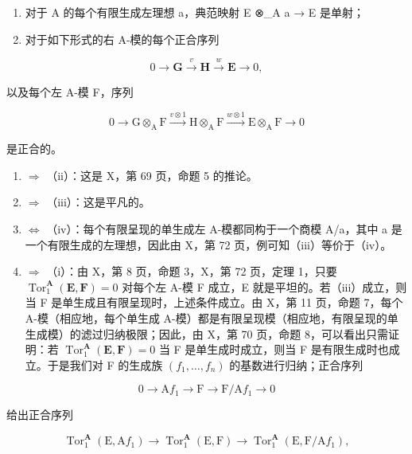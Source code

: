 \begin{enumerate}
\def\labelenumi{(\roman{enumi})}
\setcounter{enumi}{3}
\item
  对于 A 的每个有限生成左理想 a，典范映射 E ⊗\_A a → E 是单射；
\item
  对于如下形式的右 A-模的每个正合序列
\end{enumerate}

\[
0 \rightarrow \mathbf {G} \xrightarrow {v} \mathbf {H} \xrightarrow {w} \mathbf {E} \rightarrow 0,
\]

以及每个左 A-模 F，序列

\[
0 \longrightarrow \mathrm{G} \otimes_ {\mathrm{A}} \mathrm{F} \xrightarrow {v \otimes 1} \mathrm{H} \otimes_ {\mathrm{A}} \mathrm{F} \xrightarrow {w \otimes 1} \mathrm{E} \otimes_ {\mathrm{A}} \mathrm{F} \longrightarrow 0
\]

是正合的。

\begin{enumerate}
\def\labelenumi{(\roman{enumi})}
\item
  \(\Rightarrow\) （ii）：这是 X，第 69 页，命题 5 的推论。
\item
  \(\Rightarrow\) （iii）：这是平凡的。
\item
  \(\Leftrightarrow\) （iv）：每个有限呈现的单生成左 A-模都同构于一个商模 A/a，其中 a 是一个有限生成的左理想，因此由 X，第 72 页，例可知（iii）等价于（iv）。
\item
  \(\Rightarrow\) （i）：由 X，第 8 页，命题 3，X，第 72 页，定理 1，只要 \(\operatorname{Tor}_{1}^{\mathbf{A}}(\mathbf{E},\mathbf{F}) = 0\) 对每个左 A-模 F 成立，E 就是平坦的。若（iii）成立，则当 F 是单生成且有限呈现时，上述条件成立。由 X，第 11 页，命题 7，每个 A-模（相应地，每个单生成 A-模）都是有限呈现模（相应地，有限呈现的单生成模）的滤过归纳极限；因此，由 X，第 70 页，命题 8，可以看出只需证明：若 \(\operatorname{Tor}_{1}^{\mathbf{A}}(\mathbf{E},\mathbf{F}) = 0\) 当 F 是单生成时成立，则当 F 是有限生成时也成立。于是我们对 F 的生成族 \((f_{1},\ldots,f_{n})\) 的基数进行归纳；正合序列
\end{enumerate}

\[
0 \rightarrow \mathrm{A} f _ {1} \rightarrow \mathrm{F} \rightarrow \mathrm{F} / \mathrm{A} f _ {1} \rightarrow 0
\]

给出正合序列

\[
\operatorname{Tor} _ {1} ^ {\mathbf {A}} (\mathrm{E}, \mathrm{A} f _ {1}) \rightarrow \operatorname{Tor} _ {1} ^ {\mathbf {A}} (\mathrm{E}, \mathrm{F}) \rightarrow \operatorname{Tor} _ {1} ^ {\mathbf {A}} (\mathrm{E}, \mathrm{F} / \mathrm{A} f _ {1}),
\]

